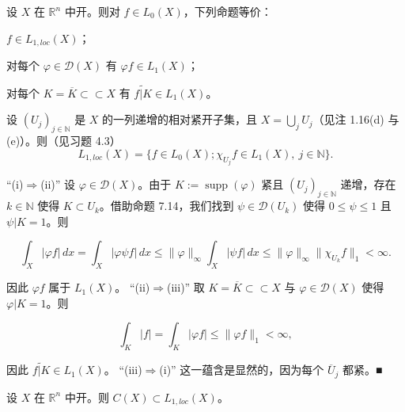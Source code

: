 \begin{application}

\begin{items}
\item

设 $ X $ 在 $ \mathbb{R}^{n} $ 中开。则对 $ f \in L_{0}(X) $，下列命题等价：

\begin{subitems}
\item

$ f \in L_{1,loc}(X) $；

\item

对每个 $ \varphi \in \mathcal{D}(X) $ 有 $ \varphi f \in L_{1}(X) $；

\item

对每个 $ K = \overline{K} \subset\subset X $ 有 $ \widetilde{f|K} \in L_{1}(X) $。

\proofhead
设 $ (U_{j})_{j\in\mathbb{N}} $ 是 $ X $ 的一列递增的相对紧开子集，且 $ X = \bigcup_{j}U_{j} $（见注 1.16(d) 与 (e)）。则（见习题 4.3）
\[
L_{1,loc}(X) = \{f \in L_{0}(X) ; \chi_{U_{j}}f \in L_{1}(X),\ j \in \mathbb{N}\} .
\]

“(i)$ \Rightarrow $(ii)” 设 $ \varphi \in \mathcal{D}(X) $。由于 $ K := \operatorname{supp}(\varphi) $ 紧且 $ (U_{j})_{j\in\mathbb{N}} $ 递增，存在 $ k \in \mathbb{N} $ 使得 $ K \subset U_{k} $。借助命题 7.14，我们找到 $ \psi \in \mathcal{D}(U_{k}) $ 使得 $ 0 \le \psi \le 1 $ 且 $ \psi|K = 1 $。则

\[
\int_{X}|\varphi f|\,dx = \int_{X}|\varphi\psi f|\,dx \le \|\varphi\|_{\infty}\int_{X}|\psi f|\,dx \le \|\varphi\|_{\infty}\|\chi_{U_{k}}f\|_{1} < \infty .
\]

因此 $ \varphi f $ 属于 $ L_{1}(X) $。
“(ii)$ \Rightarrow $(iii)” 取 $ K = \overline{K} \subset\subset X $ 与 $ \varphi \in \mathcal{D}(X) $ 使得 $ \varphi|K = 1 $。则

\[
\int_{K}|f| = \int_{K}|\varphi f| \le \|\varphi f\|_{1} < \infty ,
\]

因此 $ \widetilde{f|K} \in L_{1}(X) $。
“(iii)$ \Rightarrow $(i)” 这一蕴含是显然的，因为每个 $ \overline{U}_{j} $ 都紧。\nobreak\hspace{0.35em}■

\end{subitems}

\item

设 $ X $ 在 $ \mathbb{R}^{n} $ 中开。则 $ C(X) \subset L_{1,loc}(X) $。


\end{items}
\end{application}

